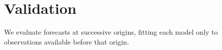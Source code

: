 \documentclass{article}
\begin{document}
\section*{Validation}
We evaluate forecasts at successive origins, fitting each model only to
observations available before that origin\cite[Section~5.10]{hyndman2021fpp3}.



\end{document}
